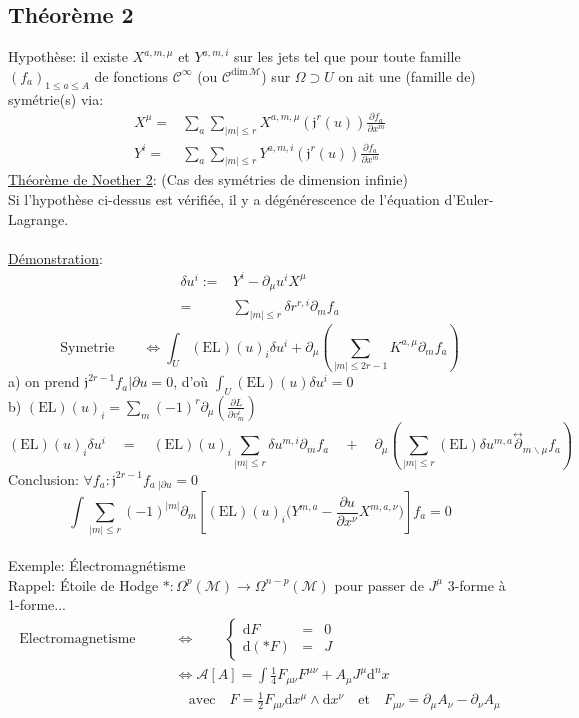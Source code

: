 \documentclass[a4paper,11pt]{article}
\renewcommand{\d}{{\mathrm{d}}}
\newcommand{\dr}[2]{\frac{\partial {#1}}{\partial{#2}}}
\begin{document}
\subsection{Théorème 2}
Hypothèse: il existe $X^{a,m,\mu}$ et $Y^{a,m,i}$ sur les jets tel que pour toute famille $(f_a)_{1\leq a \leq A}$ de fonctions $\mathcal{C}^\infty$ (ou $\mathcal{C}^{\mathrm{dim}\,\mathcal{M}}$) sur $\Omega\supset U$ on ait une (famille de) symétrie(s) via:
\begin{align*}
X^\mu =& \sum_a \sum_{|m|\leq r} X^{a,m,\mu}(\mathfrak{j}^r(u))\dr {f_a}{x^m}\\
Y^i =& \sum_a \sum_{|m|\leq r} Y^{a,m,i}(\mathfrak{j}^r(u))\dr {f_a}{x^m}
\end{align*}
\underline{Théorème de Noether 2}: (Cas des symétries de dimension infinie)\\
Si l'hypothèse ci-dessus est vérifiée, il y a dégénérescence de l'équation d'Euler-Lagrange.\\
\\
\underline{Démonstration}:
\begin{align*}
\delta u^i :=& Y^i - \partial_\mu u^i X^\mu\\
=& \sum_{|m|\leq r} \delta r ^{r,i} \partial_m f_a
\end{align*}
$$\mathrm{Symetrie} \quad \quad \iff \int_U (\mathrm{EL})(u)_i \delta u^i + \partial_\mu \left(\sum_{|m|\leq 2r-1} K^{a,\mu}\partial_m f_a\right)$$
a) on prend $\mathfrak{j}^{2r-1}f_a |{\partial u}=0$, d'où $\int_U (\mathrm{EL})(u)\delta u^i =0$\\
b) $(\mathrm{EL})(u)_i = \sum_m (-1)^r \partial_\mu (\dr L {v^i_m})$ 
$$(\mathrm{EL})(u)_i \delta u^i \quad = \quad (\mathrm{EL})(u)_i \sum_{|m|\leq r} \delta u^{m,i}\partial_m f_a \quad + \quad \partial_\mu \left(\sum_{|m|\leq r} (\mathrm{EL})\delta u^{m,a}\overset{\leftrightarrow}\partial_{m\backslash\mu} f_a\right)$$
Conclusion: $\forall f_a : \mathfrak{j}^{2r-1} f_a\,\!_{|\partial u} = 0$
$$\int \sum_{|m|\leq r} (-1)^{|m|}\partial_m\left[(\mathrm{EL})(u)_i \Big(Y^{m,a} - \dr u{x^\nu} X^{m,a,\nu}\Big)\right] f_a = 0$$
\\
Exemple: Électromagnétisme\\
Rappel: Étoile de Hodge $* : \Omega^p(\mathcal{M})\to \Omega^{n-p}(\mathcal{M})$ pour passer de $J^\mu$ 3-forme à 1-forme...
\begin{align*}
\mathrm{Electromagnetisme} \quad \quad &\iff \quad \quad \left\{
\begin{matrix}\d F & = & 0\\ \d(*F) & = & J\end{matrix}\right.\\
& \iff \mathcal{A}[A] = \int \frac{1}{4}F_{\mu\nu}F^{\mu\nu} + A_\mu J^\mu \d^n x\\
& \quad \mathrm{avec} \quad F = \frac{1}{2} F_{\mu\nu}\d x^\mu \wedge \d x^\nu \quad \mathrm{et}\quad F_{\mu\nu}=\partial_\mu A_\nu - \partial_\nu A_\mu
\end{align*}
\end{document}
